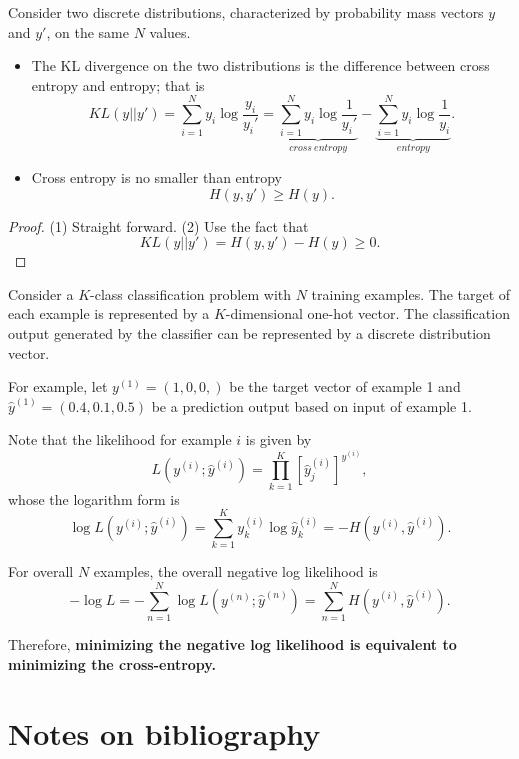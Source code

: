 \begin{refsection}
\begin{lemma}
	Consider two discrete distributions, characterized by probability mass vectors $y$ and $y'$, on the same $N$ values. 
	\begin{itemize}
		\item The KL divergence on the two distributions is the difference between cross entropy and entropy; that is
		$$KL(y||y') = \sum_{i=1}^{N} y_i \log \frac{y_i}{y_i'} = \underbrace{\sum_{i=1}^N y_i\log \frac{1}{y_i'}}_{cross~entropy} - \underbrace{\sum_{i=1}^N y_i\log \frac{1}{y_i}}_{entropy}.$$
		\item Cross entropy is no smaller than entropy 
		$$H(y,y') \geq H(y).$$
	\end{itemize} 	
\end{lemma}
\begin{proof}
	(1) Straight forward. (2) Use the fact that
	$$KL(y||y') = H(y,y') - H(y) \geq 0.$$
\end{proof}


\begin{remark}
	Consider a $K$-class classification problem with $N$ training examples. The target of each example is represented by a $K$-dimensional one-hot vector. The classification output generated by the classifier can be represented by a discrete distribution vector. 
	
	For example, let $y^{(1)} = (1,0,0,)$ be the target vector of example 1 and $\hat{y}^{(1)} = (0.4,0.1,0.5)$ be a prediction output based on input of example 1. 
	
	Note that the likelihood for example $i$ is given by
	$$L(y^{(i)};\hat{y}^{(i)}) = \prod_{k=1}^K [\hat{y}^{(i)}_j]^{y^{(i)}},$$
	whose the logarithm form is
	$$\log L(y^{(i)};\hat{y}^{(i)}) = \sum_{k=1}^K y^{(i)}_k \log \hat{y}^{(i)}_k = -H(y^{(i)},\hat{y}^{(i)}).$$
	
	For overall $N$ examples, the overall negative log likelihood is
	$$-\log L = - \sum_{n=1}^N \log L(y^{(n)};\hat{y}^{(n)}) =\sum_{n=1}^N H(y^{(i)},\hat{y}^{(i)}).$$
	
	Therefore, \textbf{minimizing the negative log likelihood is equivalent to minimizing the cross-entropy.}
	
	
\end{remark}


\section{Notes on bibliography}


\end{refsection}
